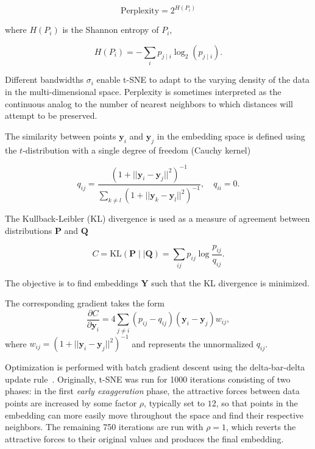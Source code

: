 \documentclass[twocolumn]{bmcart}
\begin{document}
\begin{equation}
\text{Perplexity} = 2^{H(P_i)}
\end{equation}

\noindent where $H(P_i)$ is the Shannon entropy of $P_i$,

\begin{equation}
H(P_i) = -\sum_i p_{j \mid i} \log_2 (p_{j \mid i}).
\end{equation}

\noindent Different bandwidths $\sigma_i$ enable t-SNE to adapt to the varying
density of the data in the multi-dimensional space. Perplexity is sometimes
interpreted as the continuous analog to the number of nearest neighbors to which
distances will attempt to be preserved. 

The similarity between points $\mathbf{y}_i$ and $\mathbf{y}_j$ in the
embedding space is defined using the $t$-distribution with a single degree of
freedom (Cauchy kernel)

\begin{equation}
q_{ij} = \frac{\left ( 1 + || \mathbf{y}_i - \mathbf{y}_j ||^2 \right )^{-1}}
{\sum_{k \neq l}\left ( 1 + || \mathbf{y}_k - \mathbf{y}_l ||^2 \right )^{-1}},
\quad q_{ii} = 0.
\label{eq:cauchy_kernel}
\end{equation}

The Kullback-Leibler (KL) divergence is used as a measure of agreement
between distributions $\mathbf{P}$ and $\mathbf{Q}$

\begin{equation}
C = \text{KL}(\mathbf{P} \mid \mid \mathbf{Q}) = \sum_{ij} p_{ij} \log \frac{p_{ij}}{q_{ij}}.
\label{eq:kl_divergence}
\end{equation}

\noindent The objective is to find embeddings $\mathbf{Y}$ such that the
KL divergence is minimized.

The corresponding gradient takes the form
\begin{equation}
\frac{\partial C}{\partial \mathbf{y}_i} = 4 \sum_{j \neq i} \left ( p_{ij} - q_{ij} \right ) \left ( \mathbf{y}_i - \mathbf{y}_j \right ) w_{ij},
\label{eq:tsne_gradient}
\end{equation}
where $w_{ij} = \left ( 1 + || \mathbf{y}_i - \mathbf{y}_j || ^2 \right )^{-1}$
and represents the unnormalized $q_{ij}$.

Optimization is performed with batch gradient descent using the delta-bar-delta
update rule~\cite{jacobs1988increased}. Originally, t-SNE was run for 1000
iterations consisting of two phases: in the first \textit{early exaggeration}
phase, the attractive forces between data points are increased by some factor
$\rho$, typically set to $12$, so that points in the embedding can more easily
move throughout the space and find their respective neighbors. The remaining 750
iterations are run with $\rho=1$, which reverts the attractive forces to their
original values and produces the final embedding.
\end{document}
